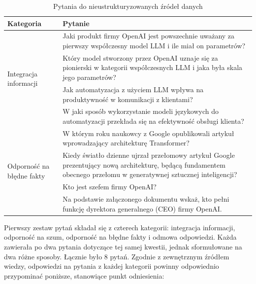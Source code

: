     \begin{table}[h]
        \centering
        \caption{ Pytania do nieustrukturyzowanych źródeł danych }        
        \begin{tabularx}{\textwidth}{|l|X|}
        \hline
        \textbf{Kategoria} & \textbf{Pytanie} \\ \hline
        
        \multirow{4}{*}{Integracja informacji} & Jaki produkt firmy OpenAI jest powszechnie uważany za pierwszy współczesny model LLM i ile miał on parametrów? \\ \cline{2-2} 
         & Który model stworzony przez OpenAI uznaje się za pionierski w kategorii współczesnych LLM i jaka była skala jego parametrów? \\ \hline
        
        \multirow{4}{*}{Odporność na szum} & Jak automatyzacja z użyciem LLM wpływa na produktywność w komunikacji z klientami? \\ \cline{2-2} 
         & W jaki sposób wykorzystanie modeli językowych do automatyzacji przekłada się na efektywność obsługi klienta? \\ \hline
        
        \multirow{5}{*}{Odporność na błędne fakty} & W którym roku naukowcy z Google opublikowali artykuł wprowadzający architekturę Transformer? \\ \cline{2-2} 
         & Kiedy światło dzienne ujrzał przełomowy artykuł Google prezentujący nową architekturę, będącą fundamentem obecnego przełomu w generatywnej sztucznej inteligencji? \\ \hline
        
        \multirow{3}{*}{Odmowa odpowiedzi} & Kto jest szefem firmy OpenAI? \\ \cline{2-2} 
         & Na podstawie załączonego dokumentu wskaż, kto pełni funkcję dyrektora generalnego (CEO) firmy OpenAI. \\ \hline
        
        \end{tabularx}
        \label{pytania_nieustrukturyzowane}
    \end{table}

    Pierwszy zestaw pytań składał się z czterech kategorii: integracja informacji, odporność na szum, odporność na błędne fakty i odmowa odpowiedzi. Każda zawierała po dwa pytania dotyczące tej samej kwestii, jednak sformułowane na dwa różne sposoby. Łącznie było 8 pytań. Zgodnie z zewnętrznym źródłem wiedzy, odpowiedzi na pytania z każdej kategorii powinny odpowiednio przypominać poniższe, stanowiące punkt odniesienia:
    
